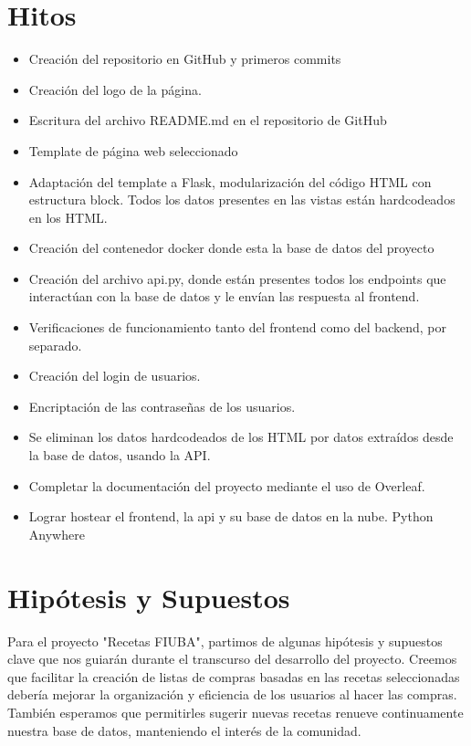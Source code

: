 \documentclass[a4paper,11pt]{article}
\begin{document}
\section*{Hitos}
\begin{itemize}
    \item Creación del repositorio en GitHub y primeros commits
    \item Creación del logo de la página.
    \item Escritura del archivo README.md en el repositorio de GitHub
    \item Template de página web seleccionado
    \item Adaptación del template a Flask, modularización del código HTML con estructura block. Todos los datos presentes en las vistas están hardcodeados en los HTML.
    \item Creación del contenedor docker donde esta la base de datos del proyecto
    \item Creación del archivo api.py, donde están presentes todos los endpoints que interactúan con la base de datos y le envían las respuesta al frontend.
    \item Verificaciones de funcionamiento tanto del frontend como del backend, por separado.
    \item Creación del login de usuarios.
    \item Encriptación de las contraseñas de los usuarios.
    \item Se eliminan los datos hardcodeados de los HTML por datos extraídos desde la base de datos, usando la API.
    \item Completar la documentación del proyecto mediante el uso de Overleaf.
    \item Lograr hostear el frontend, la api y su base de datos en la nube. Python Anywhere
\end{itemize}
\section*{Hipótesis y Supuestos}
Para el proyecto "Recetas FIUBA", partimos de algunas hipótesis y supuestos clave que nos guiarán durante el transcurso del desarrollo del proyecto. Creemos que facilitar la creación de listas de compras basadas en las recetas seleccionadas debería mejorar la organización y eficiencia de los usuarios al hacer las compras. También esperamos que permitirles sugerir nuevas recetas renueve continuamente nuestra base de datos, manteniendo el interés de la comunidad.
\end{document}
